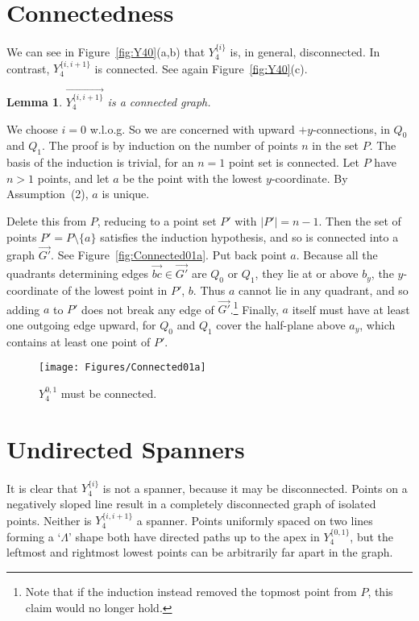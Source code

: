 \pdfoutput=1  \documentclass[]{article}
\newcommand{\ABox}{
\raisebox{3pt}{\framebox[6pt]{\rule{6pt}{0pt}}}
}
\newenvironment{proof}{{\bf Proof:}}{\hfill\ABox}
\newtheorem{lemma}[theorem]{Lemma}
\newcommand{\figlab}[1]{\label{fig:#1}}
\newcommand{\figref}[1]{\ref{fig:#1}}
\begin{document}
\section{Connectedness}
We can see in Figure~\figref{Y40}(a,b)
that
$Y_4^{\{i\}}$ is, in general, disconnected.
In contrast, $Y_4^{\{i,i+1\}}$ is connected.
See again Figure~\figref{Y40}(c).

\begin{lemma}
$\overrightarrow{Y_4^{\{i,i+1\}}}$ is a connected graph.
\end{lemma}
\begin{proof}
We choose $i{=}0$ w.l.o.g.
So we are concerned with upward $+y$-connections, in $Q_0$ and $Q_1$.
The proof is by induction on the number of points $n$ in the set $P$.
The basis of the induction is trivial, for an $n{=}1$ point set is connected.
Let $P$ have $n>1$ points, and let $a$ be the point with the lowest
$y$-coordinate.  
By Assumption~(2), $a$ is unique.  

Delete this from $P$, reducing to a point set $P'$ with $|P'| = n{-}1$.  
Then the set of points $P' = P \setminus \{a\}$
satisfies the induction hypothesis, and so is connected into a graph $\overrightarrow{G'}$. 
See Figure~\figref{Connected01a}.
Put back point $a$.
Because all the quadrants determining edges $\overrightarrow{bc} \in \overrightarrow{G'}$ are $Q_0$ or $Q_1$, they lie at or above $b_y$, the $y$-coordinate of the lowest point
in $P'$,
$b$.
Thus $a$ cannot lie in any quadrant, and so adding $a$ to $P'$ does not break any edge
of $\overrightarrow{G'}$.\footnote{
    Note that if the induction instead removed the topmost point from $P$, this claim
    would no longer hold.}
Finally, $a$ itself must have at least one outgoing edge upward, for $Q_0$ and $Q_1$ cover
the half-plane above $a_y$, which contains at least one point of $P'$.
\end{proof}



\begin{figure}[htbp]
\centering
\texttt{[image: Figures/Connected01a]}
\caption{$Y_4^{0,1}$ must be connected.}
\figlab{Connected{01}a}
\end{figure}


\section{Undirected Spanners}
It is clear that $Y_4^{\{i\}}$ is not a spanner, because it may be
disconnected.  Points on a negatively sloped line result in a completely
disconnected graph of isolated points.
Neither is $Y_4^{\{i,i+1\}}$ a spanner.  Points uniformly spaced on two lines forming a `$\Lambda$' shape
both have directed paths up to the apex in $Y_4^{\{0,1\}}$, 
but the leftmost and rightmost lowest
points can be arbitrarily far apart in the graph.
\end{document}
